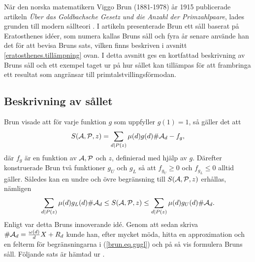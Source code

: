 \begin{comment}
När den norska matematikern Viggo Brun (1881-1978) år 1915 publicerade artikeln \textit{Über das Goldbachsche Gesetz und die Anzahl der Primzahlpaare}, lades grunden till modern sållteori \cite{ViggoBrun}. 
I artikeln presenterade Brun ett såll baserat på Eratosthenes idéer, som numera kallas Bruns såll och fyra år senare använde han det för att bevisa att summan av reciproker $\frac{1}{p_1}+\frac{1}{p_2}+...$ av primtalstvillingar $p_1,p_2,...$ konvergerar \cite{ViggoBrun}.
I detta avsnitt ges en kortfattad beskrivning av Bruns såll och ett exempel taget ur \cite{cojocarumurty} på hur sållet kan tillämpas för att ge ett resultat som angränsar till primtalstvillingsförmodan.
\end{comment}

När den norska matematikern Viggo Brun (1881-1978) år 1915 publicerade artikeln \textit{Über das Goldbachsche Gesetz und die Anzahl der Primzahlpaare}, lades grunden till modern sållteori \cite{ViggoBrun}. 
I artikeln presenterade Brun ett såll baserat på Eratosthenes idéer, som numera kallas Bruns såll och fyra år senare använde han det för att bevisa Bruns sats, vilken finns beskriven i avsnitt \ref{eratosthenes.tillämpning} ovan.
I detta avsnitt ges en kortfattad beskrivning av Bruns såll och ett exempel taget ur \cite{cojocarumurty} på hur sållet kan tillämpas för att frambringa ett resultat som angränsar till primtalstvillingsförmodan.


\subsection{Beskrivning av sållet}
Brun visade att för varje funktion $g$ som uppfyller $g(1)=1$,
så gäller det att
\begin{equation*}
    \S{A}{P}{z} 
    = \sum_{d \mid P(z)} \mu(d) g(d) \card\A_d 
    - f_g,
\end{equation*} %
där $f_g$ är en funktion av $\A,\P$ och $z$, definierad med hjälp av $g$. 
Därefter konstruerade Brun två funktioner $g_U$ och $g_L$ så att $f_{g_U}\geq 0$ och $f_{g_L}\leq 0$ alltid gäller. 
Således kan en undre och övre begränsning till $\S{A}{P}{z}$ erhållas, nämligen
\begin{equation}\label{brun.eq.gugl}
    \sum_{d \mid P(z)} \mu(d) g_L(d) \card\A_d 
    \leq \S{A}{P}{z} 
    \leq \sum_{d \mid P(z)} \mu(d) g_U(d) \card\A_d.
\end{equation}
Enligt \cite{cojocarumurty} var detta Bruns innoverande idé.
Genom att sedan skriva $\card\A_d=\frac{\omega(d)}{d}X + R_d$ kunde han, efter mycket möda, hitta en approximation och en felterm för begränsningarna i (\ref{brun.eq.gugl}) och på så vis formulera Bruns såll. Följande sats är hämtad ur \cite[Kap. 6.2]{cojocarumurty}.



